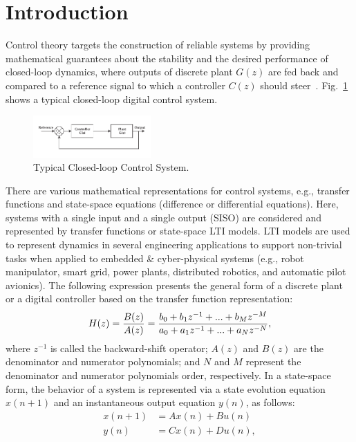 \documentclass[10pt,conference]{IEEEtran}
\begin{document}
\section{Introduction}

Control theory targets the construction of reliable systems by providing mathematical guarantees about the stability and the desired 
performance of closed-loop dynamics, where outputs of discrete plant $G(z)$ 
are fed back and compared to a reference signal to which a 
controller $C(z)$ should steer~\cite{astrom1997computer}. 
Fig.~\ref{fig:typical-control-system} shows a typical closed-loop digital control system.
%
\begin{figure}[ht!]
\centering
\includegraphics[width=0.4\textwidth]{closedloopseries.pdf}
\caption{Typical Closed-loop Control System.}
\label{fig:typical-control-system}
\end{figure}



There are various mathematical representations for control 
systems,  e.g.,  transfer functions and state-space equations (difference or differential equations). 
Here, 
systems with a single input and a single output (SISO) are considered and 
represented by transfer functions or state-space LTI models. LTI models 
are used to represent dynamics in several engineering applications to support non-trivial tasks when 
applied to embedded \& cyber-physical systems (e.g., robot manipulator, smart grid, 
power plants, distributed robotics, and automatic pilot avionics). 
The following expression presents the general form 
of a discrete plant or a digital controller based on the transfer function representation:
%
\begin{equation}
\small
\label{eq:transferfunction}
H(z)=\frac{B(z)}{A(z)}=\frac{b_{0}+b_{1}z^{-1}+...+b_{M}z^{-M}}{a_{0}+a_{1}z^{-1}+...+a_{N}z^{-N}},
\end{equation}
%
\noindent where $z^{-1}$ is called the backward-shift operator; $A(z)$ and $B(z)$ are 
the denominator and numerator polynomials; and $N$ and $M$
represent the denominator and numerator polynomials order, respectively.
%
In a state-space form, 
the behavior of a system is represented via a state evolution equation $x(n+1)$ and an instantaneous 
output equation $y(n)$, as follows:
%
\begin{equation}
\begin{split}
x(n+1) &= A x(n) + B u(n)
\\
y(n) &= C x(n) + D u(n), 
\end{split}\label{eq:ss-example}
\end{equation}
\end{document}
